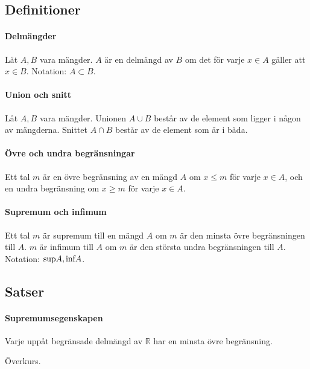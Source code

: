 \subsection{Definitioner}

\paragraph{Delmängder}

Låt $A, B$ vara mängder. $A$ är en delmängd av $B$ om det för varje $x \in A$ gäller att $x \in B$. Notation: $A \subset B$.

\paragraph{Union och snitt}

Låt $A, B$ vara mängder. Unionen $A \cup B$ består av de element som ligger i någon av mängderna. Snittet $A \cap B$ består av de element som är i båda.

\paragraph{Övre och undra begränsningar}

Ett tal $m$ är en övre begränsning av en mängd $A$ om $x \leq m$ för varje $x \in A$, och en undra begränsning om $x \geq m$ för varje $x \in A$.

\paragraph{Supremum och infimum}

Ett tal $m$ är supremum till en mängd $A$ om $m$ är den minsta övre begränsningen till $A$. $m$ är infimum till $A$ om $m$ är den största undra begränsningen till $A$. Notation: $\textnormal{sup}A, \textnormal{inf}A$.

\subsection{Satser}

\paragraph{Supremumsegenskapen}

Varje uppåt begränsade delmängd av $\mathbb{R}$ har en minsta övre begränsning.

\proof
Överkurs.